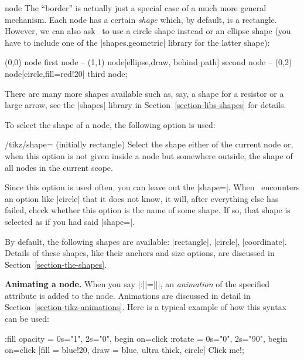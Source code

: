 \begin{pathoperation}{node}
    The ``border'' is actually just a special case of a much more general
    mechanism. Each node has a certain \emph{shape} which, by default, is a
    rectangle. However, we can also ask \tikzname\ to use a circle shape
    instead or an ellipse shape (you have to include one of the
    |shapes.geometric| library for the latter shape):
\begin{codeexample}[preamble={\usetikzlibrary{shapes.geometric}}]
\tikz \fill[fill=yellow!80!black]
      (0,0) node                            {first node}
   -- (1,1) node[ellipse,draw, behind path] {second node}
   -- (0,2) node[circle,fill=red!20]        {third node};
\end{codeexample}

    There are many more shapes available such as, say, a shape for a resistor
    or a large arrow, see the |shapes| library in
    Section~\ref{section-libs-shapes} for details.

    To select the shape of a node, the following option is used:
    \begin{key}{/tikz/shape= (initially rectangle)}
        Select the shape either of the current node or, when this option is not
        given inside a node but somewhere outside, the shape of all nodes in
        the current scope.%

        Since this option is used often, you can leave out the |shape=|. When
        \tikzname\ encounters an option like |circle| that it does not know, it
        will, after everything else has failed, check whether this option is
        the name of some shape. If so, that shape is selected as if you had
        said |shape=|.

        By default, the following shapes are available: |rectangle|, |circle|,
        |coordinate|. Details of these shapes, like their anchors and size
        options, are discussed in Section~\ref{section-the-shapes}.
    \end{key}

    \medskip
    \textbf{Animating a node.}
    When you say |:||={||}|, an
    \emph{animation} of the specified attribute is added to the node.
    Animations are discussed in detail in
    Section~\ref{section-tikz-animations}. Here is a typical example of how
    this syntax can be used:
\begin{codeexample}[imagesource={standalone/pgfmanual-en-tikz-shapes-animation-1.svg}]
\tikz
  \node  :fill opacity = { 0s="1", 2s="0", begin on=click }
         :rotate = { 0s="0", 2s="90", begin on=click }
         [fill = blue!20, draw = blue, ultra thick, circle]
    {Click me!};
\end{codeexample}


\end{pathoperation}
